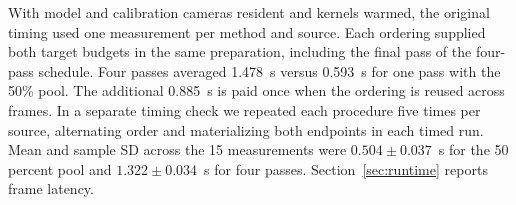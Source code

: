 With model and calibration cameras resident and kernels warmed, the original timing used one measurement per method and source. Each ordering supplied both target budgets in the same preparation, including the final pass of the four-pass schedule. Four passes averaged 1.478~s versus 0.593~s for one pass with the 50\% pool. The additional 0.885~s is paid once when the ordering is reused across frames. In a separate timing check we repeated each procedure five times per source, alternating order and materializing both endpoints in each timed run. Mean and sample SD across the 15 measurements were $0.504\pm0.037$~s for the 50 percent pool and $1.322\pm0.034$~s for four passes. Section~\ref{sec:runtime} reports frame latency.
